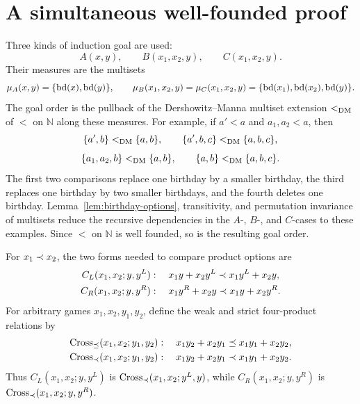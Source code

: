 \section{A simultaneous well-founded proof}

\begin{definition}
  \label{def:dm-goals}
  \leanok
  Three kinds of induction goal are used:
  \[
    A(x,y),\qquad B(x_1,x_2,y),\qquad C(x_1,x_2,y).
  \]
  Their measures are the multisets
  \[
    \mu_A(x,y)=\{\operatorname{bd}(x),\operatorname{bd}(y)\},\qquad
    \mu_B(x_1,x_2,y)=\mu_C(x_1,x_2,y)
      =\{\operatorname{bd}(x_1),\operatorname{bd}(x_2),\operatorname{bd}(y)\}.
  \]
  The goal order is the pullback of the Dershowitz--Manna multiset extension
  \(<_{\rm DM}\) of \(<\) on \(\mathbb N\) along these measures.  For example,
  if \(a'<a\) and \(a_1,a_2<a\), then
  \[
    \{a',b\}<_{\rm DM}\{a,b\},\qquad
    \{a',b,c\}<_{\rm DM}\{a,b,c\},
  \]
  \[
    \{a_1,a_2,b\}<_{\rm DM}\{a,b\},\qquad
    \{a,b\}<_{\rm DM}\{a,b,c\}.
  \]
  The first two comparisons replace one birthday by a smaller birthday, the
  third replaces one birthday by two smaller birthdays, and the fourth deletes
  one birthday.  Lemma~\ref{lem:birthday-options}, transitivity, and permutation
  invariance of multisets reduce the recursive dependencies in the
  \(A\)-, \(B\)-, and \(C\)-cases to these examples.  Since \(<\) on
  \(\mathbb N\) is well founded, so is the resulting goal order.
\end{definition}

\begin{definition}
  \label{def:cross-conditions}
  \leanok
  For \(x_1\prec x_2\), the two forms needed to compare product options are
  \[
    \begin{aligned}
      C_L(x_1,x_2;y,y^L)&:\quad
        x_1y+x_2y^L\prec x_1y^L+x_2y,\\
      C_R(x_1,x_2;y,y^R)&:\quad
        x_1y^R+x_2y\prec x_1y+x_2y^R.
    \end{aligned}
  \]
  For arbitrary games \(x_1,x_2,y_1,y_2\), define the weak and strict
  four-product relations by
  \[
    \begin{aligned}
      \operatorname{Cross}_{\preceq}(x_1,x_2;y_1,y_2)&:\quad
        x_1y_2+x_2y_1\preceq x_1y_1+x_2y_2,\\
      \operatorname{Cross}_{\prec}(x_1,x_2;y_1,y_2)&:\quad
        x_1y_2+x_2y_1\prec x_1y_1+x_2y_2.
    \end{aligned}
  \]
  Thus \(C_L(x_1,x_2;y,y^L)\) is
  \(\operatorname{Cross}_{\prec}(x_1,x_2;y^L,y)\), while
  \(C_R(x_1,x_2;y,y^R)\) is
  \(\operatorname{Cross}_{\prec}(x_1,x_2;y,y^R)\).
\end{definition}

